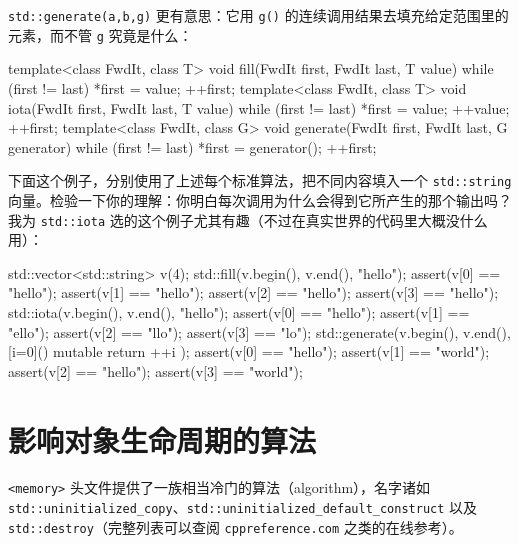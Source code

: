\texttt{std::\allowbreak{}generate(\allowbreak{}a,\allowbreak{}b,\allowbreak{}g)\allowbreak{}} 更有意思：它用 \texttt{g(\allowbreak{})\allowbreak{}} 的连续调用结果去填充给定范围里的元素，而不管 \texttt{g} 究竟是什么：

\begin{codebox}[cpp]
    template<class FwdIt, class T>
    void fill(FwdIt first, FwdIt last, T value) {
      while (first != last) {
        *first = value;
         ++first;
      }
    }
    template<class FwdIt, class T>
    void iota(FwdIt first, FwdIt last, T value) {
      while (first != last) {
        *first = value;
        ++value;
        ++first;
      }
    }
    template<class FwdIt, class G>
    void generate(FwdIt first, FwdIt last, G generator) {
      while (first != last) {
        *first = generator();
        ++first;
      }
    }
\end{codebox}

下面这个例子，分别使用了上述每个标准算法，把不同内容填入一个 \texttt{std::\allowbreak{}string} 向量。检验一下你的理解：你明白每次调用为什么会得到它所产生的那个输出吗？我为 \texttt{std::\allowbreak{}iota} 选的这个例子尤其有趣（不过在真实世界的代码里大概没什么用）：

\begin{codebox}[cpp]
    std::vector<std::string> v(4);
    std::fill(v.begin(), v.end(), "hello");
    assert(v[0] == "hello");
    assert(v[1] == "hello");
    assert(v[2] == "hello");
    assert(v[3] == "hello");
    std::iota(v.begin(), v.end(), "hello");
    assert(v[0] == "hello");
    assert(v[1] == "ello");
    assert(v[2] == "llo");
    assert(v[3] == "lo");
    std::generate(v.begin(), v.end(), [i=0]() mutable {
      return ++i %
    });
    assert(v[0] == "hello");
    assert(v[1] == "world");
    assert(v[2] == "hello");
    assert(v[3] == "world");
\end{codebox}

\section{影响对象生命周期的算法}

\texttt{<memory>\allowbreak{}} 头文件提供了一族相当冷门的算法（algorithm），名字诸如 \texttt{std::\allowbreak{}uninitialized\_\allowbreak{}copy}、\texttt{std::\allowbreak{}uninitialized\_\allowbreak{}default\_\allowbreak{}construct} 以及 \texttt{std::\allowbreak{}destroy}（完整列表可以查阅 \texttt{cppreference.\allowbreak{}com} 之类的在线参考）。

